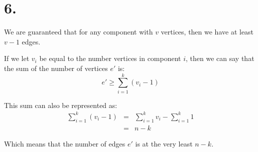 \documentclass[11pt]{article}
\begin{document}
\newpage
\section*{6.}
We are guaranteed that for any component with $v$ vertices, then we have at
least $v - 1$ edges.

If we let $v_i$ be equal to the number vertices in component $i$, then we can
say that the sum of the number of vertices $e'$ is:
\begin{equation*}
e' \ge \sum_{i=1}^{k} (v_i - 1)
\end{equation*}

This sum can also be represented as: 
\begin{eqnarray*}
\sum_{i=1}^{k} (v_i - 1) &=& \sum_{i=1}^k v_i - \sum_{i=1}^{k} 1\\
&=& n - k
\end{eqnarray*}

Which means that the number of edges $e'$ is at the very least $n-k$.
\end{document}
